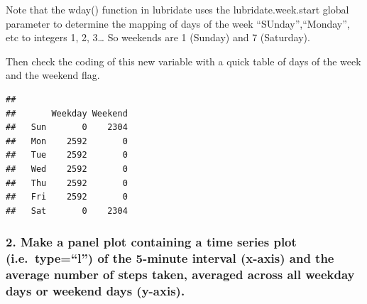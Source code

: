 \documentclass[]{article}
\newenvironment{Shaded}{\begin{snugshade}}{\end{snugshade}}
\newcommand{\KeywordTok}[1]{\textcolor[rgb]{0.13,0.29,0.53}{\textbf{#1}}}
\newcommand{\DataTypeTok}[1]{\textcolor[rgb]{0.13,0.29,0.53}{#1}}
\newcommand{\DecValTok}[1]{\textcolor[rgb]{0.00,0.00,0.81}{#1}}
\newcommand{\StringTok}[1]{\textcolor[rgb]{0.31,0.60,0.02}{#1}}
\newcommand{\OtherTok}[1]{\textcolor[rgb]{0.56,0.35,0.01}{#1}}
\newcommand{\OperatorTok}[1]{\textcolor[rgb]{0.81,0.36,0.00}{\textbf{#1}}}
\newcommand{\NormalTok}[1]{#1}
\begin{document}
Note that the wday() function in lubridate uses the lubridate.week.start
global parameter to determine the mapping of days of the week
``SUnday'',``Monday'', etc to integers 1, 2, 3\ldots{} So weekends are 1
(Sunday) and 7 (Saturday).

\begin{Shaded}
\end{Shaded}

Then check the coding of this new variable with a quick table of days of
the week and the weekend flag.

\begin{Shaded}
\end{Shaded}

\begin{verbatim}
##      
##       Weekday Weekend
##   Sun       0    2304
##   Mon    2592       0
##   Tue    2592       0
##   Wed    2592       0
##   Thu    2592       0
##   Fri    2592       0
##   Sat       0    2304
\end{verbatim}

\subsubsection{\texorpdfstring{2. Make a panel plot containing a time
series plot (i.e.~type=``l'') of the 5-minute interval (x-axis) and the
average number of steps taken, averaged across all weekday days or
weekend days
(y-axis).}{2. Make a panel plot containing a time series plot (i.e.~type=l) of the 5-minute interval (x-axis) and the average number of steps taken, averaged across all weekday days or weekend days (y-axis).}}\label{make-a-panel-plot-containing-a-time-series-plot-i.e.typel-of-the-5-minute-interval-x-axis-and-the-average-number-of-steps-taken-averaged-across-all-weekday-days-or-weekend-days-y-axis.}
\end{document}
